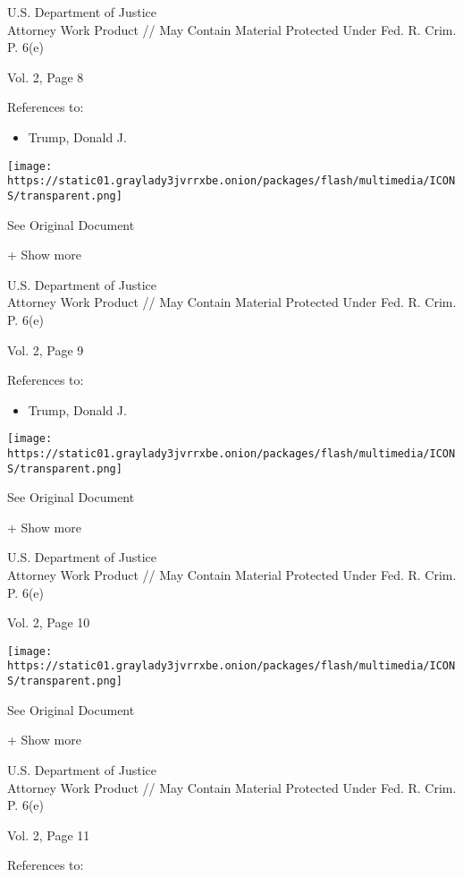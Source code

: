 U.S. Department of Justice\\
Attorney Work Product // May Contain Material Protected Under Fed. R.
Crim. P. 6(e)

Vol. 2, Page 8

References to:

\begin{itemize}
\tightlist
\item
  Trump, Donald J.
\end{itemize}

\protect\hyperlink{}{}

\texttt{[image: https://static01.graylady3jvrrxbe.onion/packages/flash/multimedia/ICONS/transparent.png]}

See Original Document

+ Show more

U.S. Department of Justice\\
Attorney Work Product // May Contain Material Protected Under Fed. R.
Crim. P. 6(e)

Vol. 2, Page 9

References to:

\begin{itemize}
\tightlist
\item
  Trump, Donald J.
\end{itemize}

\protect\hyperlink{}{}

\texttt{[image: https://static01.graylady3jvrrxbe.onion/packages/flash/multimedia/ICONS/transparent.png]}

See Original Document

+ Show more

U.S. Department of Justice\\
Attorney Work Product // May Contain Material Protected Under Fed. R.
Crim. P. 6(e)

Vol. 2, Page 10

\protect\hyperlink{}{}

\texttt{[image: https://static01.graylady3jvrrxbe.onion/packages/flash/multimedia/ICONS/transparent.png]}

See Original Document

+ Show more

U.S. Department of Justice\\
Attorney Work Product // May Contain Material Protected Under Fed. R.
Crim. P. 6(e)

Vol. 2, Page 11

References to:

